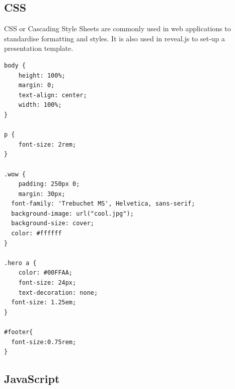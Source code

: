 \documentclass[11pt,a4paper,final]{article}
\begin{document}
\subsection{CSS}
CSS or Cascading Style Sheets are commonly used in web applications to standardise formatting and styles. It is also used in reveal.js to set-up a presentation template.
\begin{verbatim}
body {
	height: 100%;
	margin: 0;
	text-align: center;
	width: 100%;
}

p {
	font-size: 2rem;
}

.wow {
	padding: 250px 0;
	margin: 30px;
  font-family: 'Trebuchet MS', Helvetica, sans-serif;
  background-image: url("cool.jpg");
  background-size: cover;
  color: #ffffff
}

.hero a {
	color: #00FFAA;
	font-size: 24px;
	text-decoration: none;
  font-size: 1.25em;
}

#footer{
  font-size:0.75rem;
}
\end{verbatim}

\subsection{JavaScript}
\end{document}
